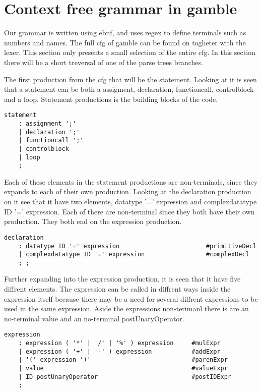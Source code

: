 \section{Context free grammar in gamble}
Our grammar is written using \acrfull{ebnf}, and uses \acrfull{regex} to define terminals such as numbers and names.
The full \acrshort{cfg} of \gls{gamble} can be found on  togheter with the lexer. This section only presents a small selection of the entire \acrshort{cfg}.
In this section there will be a short treversal of one of the parse trees branches.

The first production from the \acrshort{cfg} that will be the statement. Looking at  it is seen that a statement can be both a assigment, declaration, functioncall, controlblock and a loop. Statement productions is the building blocks of the code.

\begin{lstlisting}[caption={\acrshort{cfg} Statement},label={lst:statements},numbers=none]
statement
    : assignment ';'
    | declaration ';'
    | functioncall ';'
    | controlblock
    | loop
    ;
\end{lstlisting}

Each of these elements in the statement productions are non-terminals, since they expands to each of their own production.
Looking at the declaration production on  it see that it have two elements, datatype '=' expression and complexdatatype ID '=' expression.
Each of there are non-terminal since they both have their own production. They both end on the expression production.

\begin{lstlisting}[caption={\acrshort{cfg} Declaration},label={lst:declaration},numbers=none]
declaration
    : datatype ID '=' expression                        #primitiveDecl
    | complexdatatype ID '=' expression                 #complexDecl
    ; ;
\end{lstlisting}

Further expanding into the expression production, it is seen that it have five diffrent elements.
The expression can be called in diffrent ways inside the expression itself because there may be a need for several diffrent expressions to be used in the same expression.
Aside the expressions non-terimanl there is are an no-terminal value and an no-terminal postUnaryOperator.
\begin{lstlisting}[caption={\acrshort{cfg} Declaration},label={lst:declaration},numbers=none]
expression
    : expression ( '*' | '/' | '%' ) expression     #mulExpr
    | expression ( '+' | '-' ) expression           #addExpr
    | '(' expression ')'                            #parenExpr
    | value                                         #valueExpr
    | ID postUnaryOperator                          #postIDExpr
    ;
\end{lstlisting}
  
